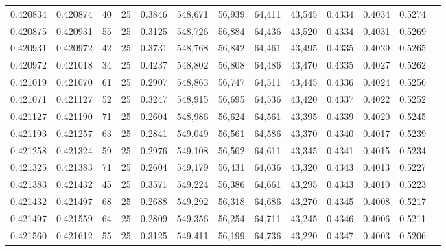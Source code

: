 \begin{tabular}{rrrrrrrrrrrrr}
0.420834 & 0.420874 &    40 &  25 &                                     0.3846 & 548,671 &  56,939 &  64,411 &  43,545 & 0.4334 & 0.4034 & 0.5274 \\
0.420875 & 0.420931 &    55 &  25 &                                     0.3125 & 548,726 &  56,884 &  64,436 &  43,520 & 0.4334 & 0.4031 & 0.5269 \\
0.420931 & 0.420972 &    42 &  25 &                                     0.3731 & 548,768 &  56,842 &  64,461 &  43,495 & 0.4335 & 0.4029 & 0.5265 \\
0.420972 & 0.421018 &    34 &  25 &                                     0.4237 & 548,802 &  56,808 &  64,486 &  43,470 & 0.4335 & 0.4027 & 0.5262 \\
0.421019 & 0.421070 &    61 &  25 &                                     0.2907 & 548,863 &  56,747 &  64,511 &  43,445 & 0.4336 & 0.4024 & 0.5256 \\
0.421071 & 0.421127 &    52 &  25 &                                     0.3247 & 548,915 &  56,695 &  64,536 &  43,420 & 0.4337 & 0.4022 & 0.5252 \\
0.421127 & 0.421190 &    71 &  25 &                                     0.2604 & 548,986 &  56,624 &  64,561 &  43,395 & 0.4339 & 0.4020 & 0.5245 \\
0.421193 & 0.421257 &    63 &  25 &                                     0.2841 & 549,049 &  56,561 &  64,586 &  43,370 & 0.4340 & 0.4017 & 0.5239 \\
0.421258 & 0.421324 &    59 &  25 &                                     0.2976 & 549,108 &  56,502 &  64,611 &  43,345 & 0.4341 & 0.4015 & 0.5234 \\
0.421325 & 0.421383 &    71 &  25 &                                     0.2604 & 549,179 &  56,431 &  64,636 &  43,320 & 0.4343 & 0.4013 & 0.5227 \\
0.421383 & 0.421432 &    45 &  25 &                                     0.3571 & 549,224 &  56,386 &  64,661 &  43,295 & 0.4343 & 0.4010 & 0.5223 \\
0.421432 & 0.421497 &    68 &  25 &                                     0.2688 & 549,292 &  56,318 &  64,686 &  43,270 & 0.4345 & 0.4008 & 0.5217 \\
0.421497 & 0.421559 &    64 &  25 &                                     0.2809 & 549,356 &  56,254 &  64,711 &  43,245 & 0.4346 & 0.4006 & 0.5211 \\
0.421560 & 0.421612 &    55 &  25 &                                     0.3125 & 549,411 &  56,199 &  64,736 &  43,220 & 0.4347 & 0.4003 & 0.5206 \\

\end{tabular}
